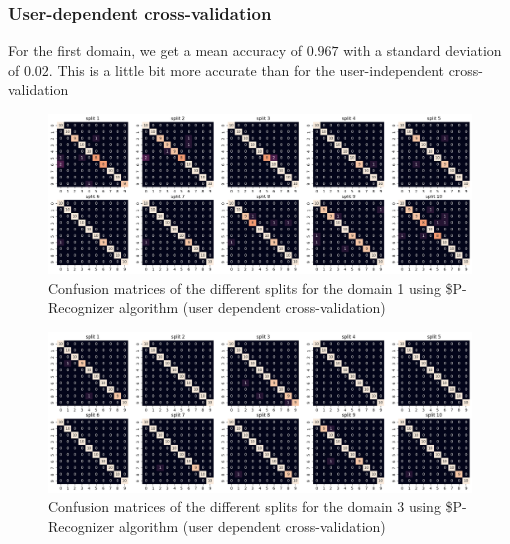 \subsubsection{User-dependent cross-validation}

For the first domain, we get a mean accuracy of $0.967$ with a standard deviation of $0.02$. This is a little bit more accurate than for the user-independent cross-validation 

\begin{figure}[H]
	\centering
	\includegraphics{figures/pcr/domain01/cm_pcr_d1_udep.png}
	\caption{Confusion matrices of the different splits for the domain 1 using \$P-Recognizer algorithm (user dependent cross-validation)}
	\label{fig:cm-pcr-d1-udep}
\end{figure}


\begin{figure}[H]
	\centering
	\includegraphics{figures/pcr/domain03/cm_pcr_d3_udep.png}
	\caption{Confusion matrices of the different splits for the domain 3 using \$P-Recognizer algorithm (user dependent cross-validation)}
	\label{fig:cm-pcr-d3-udep}
\end{figure}
